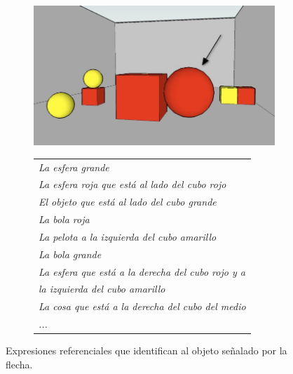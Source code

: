 \begin{figure}[h]
\begin{subfigure}{.5\textwidth}
  \centering
\includegraphics[width=\textwidth]{images/22sinletrasClaro.jpg}
  \caption{}\label{GRE3D7-stimulus1}
\end{subfigure}%
\begin{subfigure}{.5\textwidth}
 \centering
\begin{tabular}{l}
 {\it La esfera grande}\\

 {\it La esfera roja que est\'a al lado del cubo rojo} \\

 {\it El objeto que est\'a al lado del cubo grande}\\

 {\it La bola roja}\\

 {\it La pelota a la izquierda del cubo amarillo}\\

 {\it La bola grande}\\

 {\it La esfera que est\'a a la derecha del cubo rojo y a }\\
{\it la izquierda del cubo amarillo}\\

 {\it La cosa que est\'a a la derecha del cubo del medio}\\

  {\it ...}
 \end{tabular}
\hspace*{-30cm}
\centering\caption{}\label{er-figura1}
\end{subfigure}
\begin{centering}
\caption{Expresiones referenciales que identifican al objeto se\~nalado por la flecha.}
\label{figura-er}
\end{centering}
\end{figure}

